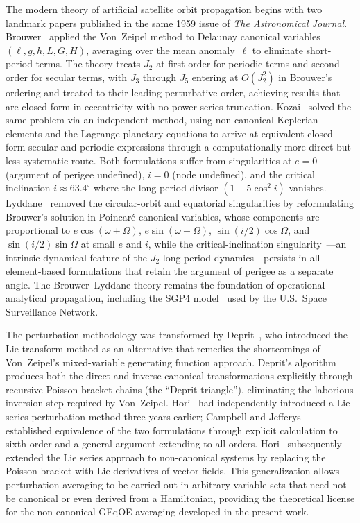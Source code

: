 The modern theory of artificial satellite orbit propagation begins with two
landmark papers published in the same 1959 issue of \emph{The Astronomical
Journal}.  Brouwer~\cite{brouwer1959} applied the Von~Zeipel method to
Delaunay canonical variables $(\ell, g, h, L, G, H)$, averaging over the
mean anomaly~$\ell$ to eliminate short-period terms.  The theory treats
$J_2$ at first order for periodic terms and second order for secular terms,
with $J_3$ through $J_5$ entering at $O(J_2^2)$ in Brouwer's ordering
and treated to their leading perturbative order, achieving results that are
closed-form in eccentricity with no power-series truncation.
Kozai~\cite{kozai1959} solved the same problem via an independent method,
using non-canonical Keplerian elements and the Lagrange planetary equations
to arrive at equivalent closed-form secular and periodic expressions through
a computationally more direct but less systematic route.  Both formulations
suffer from singularities at $e = 0$ (argument of perigee undefined),
$i = 0$ (node undefined), and the critical inclination
$i \approx 63.4^\circ$ where the long-period divisor $(1 - 5\cos^2 i)$
vanishes.  Lyddane~\cite{lyddane1963} removed the circular-orbit and
equatorial singularities by reformulating Brouwer's solution in
Poincar\'e canonical variables, whose components are
proportional to $e\cos(\omega+\Omega)$, $e\sin(\omega+\Omega)$,
$\sin(i/2)\cos\Omega$, and $\sin(i/2)\sin\Omega$ at small $e$ and $i$,
while the critical-inclination singularity~\cite{brouwer1959}---an
intrinsic dynamical feature of the $J_2$ long-period dynamics---persists in
all element-based formulations that retain the argument of perigee as a
separate angle.  The Brouwer--Lyddane theory remains the foundation of
operational analytical propagation, including the SGP4
model~\cite{spacetrack1980,vallado2006} used by the U.S.\ Space
Surveillance Network.

The perturbation methodology was transformed by Deprit~\cite{deprit1969},
who introduced the Lie-transform method as an alternative that remedies
the shortcomings of Von~Zeipel's mixed-variable generating function
approach.  Deprit's algorithm produces
both the direct and inverse canonical transformations explicitly through
recursive Poisson bracket chains (the ``Deprit triangle''), eliminating the
laborious inversion step required by Von~Zeipel.  Hori~\cite{hori1966} had
independently introduced a Lie series perturbation method three years
earlier; Campbell and Jefferys~\cite{campbell1970} established equivalence
of the two formulations through explicit calculation to sixth order and a
general argument extending to all orders.  Hori~\cite{hori1971} subsequently
extended the Lie series approach to non-canonical systems by replacing the
Poisson bracket with Lie derivatives of vector fields.  This generalization
allows perturbation averaging to be carried out in arbitrary variable sets
that need not be canonical or even derived from a Hamiltonian, providing
the theoretical license for the non-canonical GEqOE averaging developed
in the present work.

